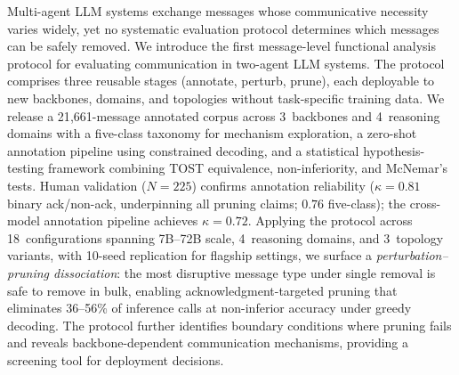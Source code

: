 Multi-agent LLM systems exchange messages whose communicative necessity varies widely, yet no systematic evaluation protocol determines which messages can be safely removed. We introduce the first message-level functional analysis protocol for evaluating communication in two-agent LLM systems. The protocol comprises three reusable stages (annotate, perturb, prune), each deployable to new backbones, domains, and topologies without task-specific training data. We release a 21{,}661-message annotated corpus across 3~backbones and 4~reasoning domains with a five-class taxonomy for mechanism exploration, a zero-shot annotation pipeline using constrained decoding, and a statistical hypothesis-testing framework combining TOST equivalence, non-inferiority, and McNemar's tests. Human validation ($N{=}225$) confirms annotation reliability ($\kappa = 0.81$ binary ack/non-ack, underpinning all pruning claims; $0.76$ five-class); the cross-model annotation pipeline achieves $\kappa{=}0.72$. Applying the protocol across 18~configurations spanning 7B--72B scale, 4~reasoning domains, and 3~topology variants, with 10-seed replication for flagship settings, we surface a \emph{perturbation--pruning dissociation}: the most disruptive message type under single removal is safe to remove in bulk, enabling acknowledgment-targeted pruning that eliminates 36--56\% of inference calls at non-inferior accuracy under greedy decoding. The protocol further identifies boundary conditions where pruning fails and reveals backbone-dependent communication mechanisms, providing a screening tool for deployment decisions.
